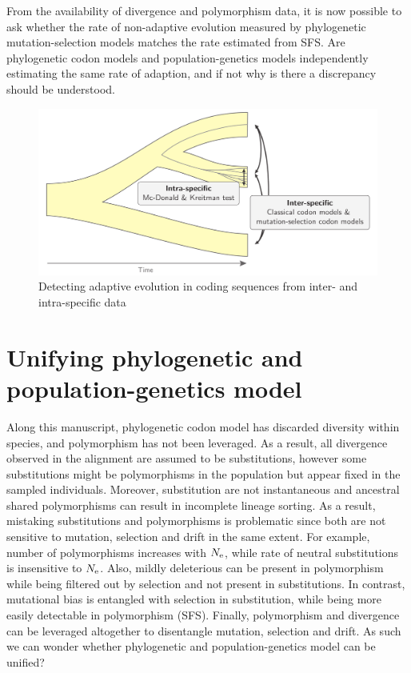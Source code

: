 From the availability of divergence and polymorphism data, it is now possible to ask whether the rate of non-adaptive evolution measured by phylogenetic mutation-selection models matches the rate estimated from \acrshort{SFS}.
Are phylogenetic \gls{codon} models and population-genetics models independently estimating the same rate of adaption, and if not why is there a discrepancy should be understood.


\begin{figure}[H]
	\centering
	\includegraphics[width=\textwidth] {figures/inter-intra}
	\caption{Detecting adaptive evolution in coding sequences from inter- and intra-specific data}
\end{figure}


\section{Unifying phylogenetic and population-genetics model}
\label{sec:unifying-phylogenetic-and-population-genetics-model}

Along this manuscript, phylogenetic codon model has discarded diversity within species, and polymorphism has not been leveraged.
As a result, all divergence observed in the alignment are assumed to be substitutions, however some substitutions might be polymorphisms in the population but appear fixed in the sampled individuals.
Moreover, substitution are not instantaneous and ancestral shared polymorphisms can result in incomplete lineage sorting.
As a result, mistaking substitutions and polymorphisms is problematic since both are not sensitive to mutation, selection and drift in the same extent.
For example, number of polymorphisms increases with $N_{\textrm{e}}$, while rate of neutral substitutions is insensitive to $N_{\textrm{e}}$.
Also, mildly deleterious can be present in polymorphism while being filtered out by selection and not present in substitutions.
In contrast, mutational bias is entangled with selection in substitution, while being more easily detectable in polymorphism (\acrshort{SFS}).
Finally, polymorphism and divergence can be leveraged altogether to disentangle mutation, selection and drift.
As such we can wonder whether phylogenetic and population-genetics model can be unified?

